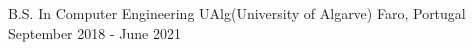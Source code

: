 

\begin{cventries}

  \cventry
    {B.S. In Computer Engineering} %
    {UAlg(University of Algarve)} %
    {Faro, Portugal} %
    {September 2018 - June 2021} %
    {
    }

\end{cventries}
